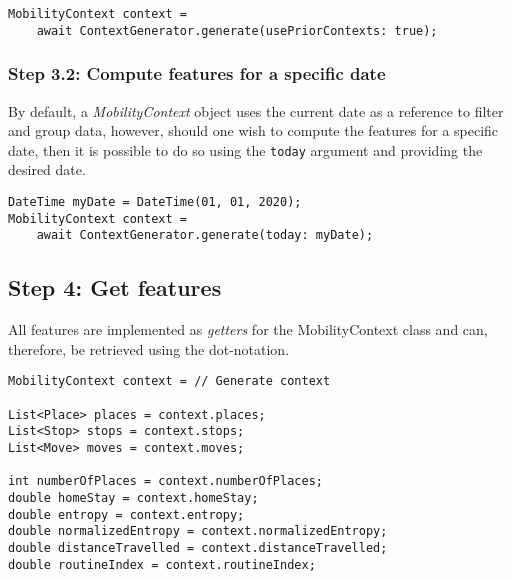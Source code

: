 \begin{verbatim}
MobilityContext context = 
    await ContextGenerator.generate(usePriorContexts: true);
\end{verbatim}

\subsubsection*{Step 3.2: Compute features for a specific date}
By default, a \textit{MobilityContext} object uses the current date as a reference to filter and group data, however, should one wish to compute the features for a specific date, then it is possible to do so using the \verb|today| argument and providing the desired date.

\begin{verbatim}
DateTime myDate = DateTime(01, 01, 2020);
MobilityContext context = 
    await ContextGenerator.generate(today: myDate);
\end{verbatim}

\subsection*{Step 4: Get features}
All features are implemented as \textit{getters} for the MobilityContext class and can, therefore, be retrieved using the dot-notation. 

\begin{verbatim}
MobilityContext context = // Generate context

List<Place> places = context.places;
List<Stop> stops = context.stops;
List<Move> moves = context.moves;

int numberOfPlaces = context.numberOfPlaces;
double homeStay = context.homeStay;
double entropy = context.entropy;
double normalizedEntropy = context.normalizedEntropy;
double distanceTravelled = context.distanceTravelled;
double routineIndex = context.routineIndex;
\end{verbatim}